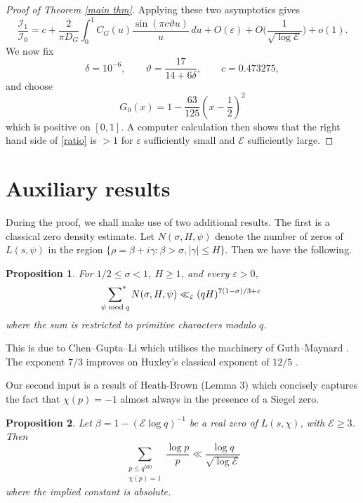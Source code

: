 \documentclass[12pt, oneside]{amsart}
\newtheorem{prop}{Proposition}
\theoremstyle{definition}
\newcommand{\mc}{\mathcal}
\newcommand{\leqs}{\leqslant }
\newcommand{\geqs}{\geqslant }
\newcommand{\eps}{\varepsilon}
\newcommand{\1}{\mathds{1}}
\begin{document}
\begin{proof}[Proof of Theorem \ref{main thm}]
Applying these two asymptotics gives
\begin{equation}\label{ratio}
\frac{\mc{I}_1}{\mc{I}_0}= c+ \frac{2}{\pi D_G}\int_0^1 C_G(u)
 \frac{\sin(\pi c\vartheta u)}u\,du+O(\eps)+O\Big(\frac{1}{\sqrt{\log\mc{E}}}\Big)+o(1).
\end{equation}
We now fix
\[
 \delta=10^{-6},\qquad
 \vartheta=\frac{17}{14+6\delta},
 \qquad
 c=0.473275,
\]
and choose
\[
 G_0(x)=1-\frac{63}{125}\left(x-\frac12\right)^2
\]
which is positive on $[0,1]$.  A computer calculation then shows that the right hand side of \eqref{ratio} is $>1$ for $\eps$ sufficiently small and $\mc{E}$ sufficiently large.
\end{proof}




\section{Auxiliary results}

During the proof, we shall make use of two additional results. The first is a classical zero density estimate. Let $N(\sigma,H,\psi)$ denote the number of zeros of $L(s,\psi)$ in the region $\{\rho=\beta+i\gamma: \beta>\sigma, |\gamma|\leqs H\}$. Then we have the following.

\begin{prop}
\label{prop:density}
For $1/2\leqs\sigma<1$, $H\geqs1$, and every $\eps>0$,
\begin{equation}
 \sideset{}{^*}\sum_{\psi\bmod q}N(\sigma,H,\psi)
 \ll_{\eps}
 (qH)^{7(1-\sigma)/3+\eps}
 \label{eq:density}
\end{equation}
where the sum is restricted to primitive characters modulo $q$.
\end{prop}

This is due to Chen--Gupta--Li \cite{ChenGuptaLi} which utilises the machinery of Guth--Maynard \cite{GM}. The exponent $7/3$ improves on Huxley's classical exponent of $12/5$ \cite{HuxleyLVDP}.

Our second input is a result of Heath-Brown \cite{HB} (Lemma 3) which concisely captures the fact that $\chi(p)=-1$ almost always in the presence of a Siegel zero. 

\begin{prop}
\label{Heath-Brown prop}
Let $\beta=1-(\mc{E}\log q)^{-1}$ be a real zero of $L(s,\chi)$, with
$\mc{E}\geqs 3$.  Then
\begin{equation}
 \sum_{\substack{p\leqs q^{500}\\ \chi(p)=1}}
 \frac{\log p}{p}
 \ll \frac{\log q}{\sqrt{\log\mc{E}}}
 \label{eq:bad-primes}
\end{equation}
where the implied constant is absolute.
\end{prop}
\end{document}
